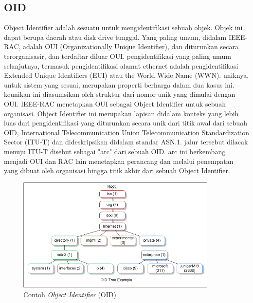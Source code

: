 		\subsection{OID}
			Object Identifier adalah sesuatu untuk mengidentifikasi sebuah objek. Objek ini dapat berupa daerah atau disk drive tunggal. Yang paling umum, didalam IEEE-RAC, adalah OUI (Organizationally Unique Identifier), dan diturunkan secara terorganisasir, dan terdaftar diluar OUI. pengidentifikasi yang paling umum selanjutnya, termasuk pengidentifikasi alamat ethernet adalah pengidentifikasi Extended Unique Identifiers (EUI) atau the World Wide Name (WWN). uniknya, untuk sistem yang sesuai, merupakan properti berharga dalam dua kasus ini. keunikan ini diasumsikan oleh struktur dari nomor unik yang dimulai dengan OUI. IEEE-RAC menetapkan OUI sebagai Object Identifier untuk sebuah organisasi. Object Identifier ini merupakan lapisan didalam konteks yang lebih luas dari pengidentifikasi yang diturunkan secara unik dari titik awal dari sebuah OID, International
			Telecommunication Union Telecommunication Standardization Sector (ITU-T) dan dideskripsikan didalam standar ASN.1. jalur tersebut dilacak menuju ITU-T disebut sebagai "arc" dari sebuah OID. arc ini berkembang menjadi OUI dan RAC lain menetapkan perancang dan melalui penempatan yang dibuat oleh organisasi hingga titik akhir dari sebuah Object Identifier.
			\begin{figure}[H]
				\centering
				\includegraphics[width=10cm]{Images/C-2/OID.png}
				\caption{Contoh \textit{Object Identifier} (OID)}
				\label{oidexample}
			\end{figure}
